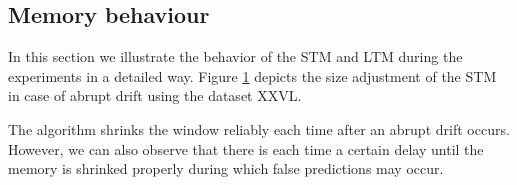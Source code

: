 \documentclass[conference]{IEEEtran}
\begin{document}
\subsection{Memory behaviour}
In this section we illustrate the behavior of the STM and LTM during the experiments in a detailed way. 
Figure \ref{fig:abrupt} depicts the size adjustment of the STM in case of abrupt drift using the dataset XXVL. 
\begin{figure}
\centering
	\vspace{0 pt}
\label{fig:abrupt}
\caption{}
\end{figure}
The algorithm shrinks the window reliably each time after an abrupt drift occurs.
However, we can also observe that there is each time a certain delay until the memory is shrinked properly during which false predictions may occur. 
\end{document}
